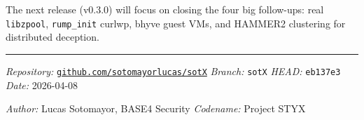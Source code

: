 \documentclass[11pt,a4paper]{article}
\begin{document}
The next release (v0.3.0) will focus on closing the four big
follow-ups: real \texttt{libzpool}, \texttt{rump\_init} curlwp,
bhyve guest VMs, and HAMMER2 clustering for distributed deception.

\vspace{1em}
\hrule
\vspace{0.5em}
\noindent\textit{Repository:}
\href{https://github.com/sotomayorlucas/sotX}{\texttt{github.com/sotomayorlucas/sotX}}
\quad \textit{Branch:} \texttt{sotX}
\quad \textit{HEAD:} \texttt{eb137e3}
\quad \textit{Date:} 2026-04-08

\noindent\textit{Author:} Lucas Sotomayor, BASE4 Security
\quad \textit{Codename:} Project STYX

\end{document}
